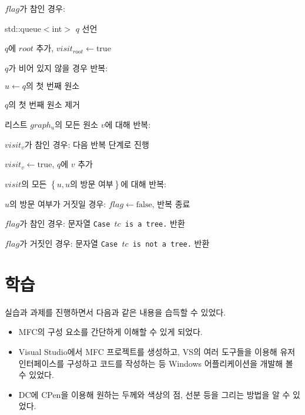 \begin{algorithm}
	\item $flag$가 참인 경우:
	\begin{algorithm}
		\item std::queue$<$int$>$ $q$ 선언
		\item $q$에 $root$ 추가, $visit_{root} \leftarrow \mathrm{true}$
		\item $q$가 비어 있지 않을 경우 반복:
		\begin{algorithm}
			\item $u \leftarrow q\textrm{의 첫 번째 원소}$
			\item $q$의 첫 번째 원소 제거
			\item 리스트 $graph_u$의 모든 원소 $v$에 대해 반복:
			\begin{algorithm}
				\item $visit_v$가 참인 경우: 다음 반복 단계로 진행
				\item $visit_v \leftarrow \mathrm{true}$, $q$에 $v$ 추가
			\end{algorithm}
		\end{algorithm}
		\item $visit$의 모든 $\left\{u, u\textrm{의 방문 여부}\right\}$에 대해 반복:
		\begin{algorithm}
			\item $u$의 방문 여부가 거짓일 경우: $flag \leftarrow \mathrm{false}$, 반복 종료
		\end{algorithm}
	\end{algorithm}
	\item $flag$가 참인 경우: 문자열 \texttt{Case }$tc$\texttt{ is a tree.} 반환
	\item $flag$가 거짓인 경우: 문자열 \texttt{Case }$tc$\texttt{ is not a tree.} 반환
\end{algorithm}

\section{학습}
실습과 과제를 진행하면서 다음과 같은 내용을 습득할 수 있었다.
\begin{itemize}
	\item MFC의 구성 요소를 간단하게 이해할 수 있게 되었다.
	\item Visual Studio에서 MFC 프로젝트를 생성하고, VS의 여러 도구들을 이용해
	유저 인터페이스를 구성하고 코드를 작성하는 등 Windows 어플리케이션을 개발해 볼 수 있었다.
	\item DC에 CPen을 이용해 원하는 두께와 색상의 점, 선분 등을 그리는 방법을 알 수 있었다.
\end{itemize}



